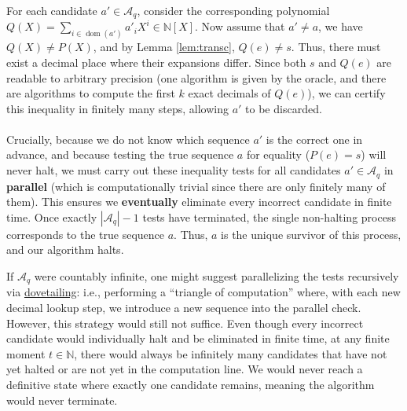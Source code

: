\begin{solution}
    For each candidate \( a'\in \mathcal{A}_{q} \), consider the corresponding polynomial \( Q\left(X\right) = \sum_{i\in \operatorname{dom}\left(a'\right)} a'_i X^i\in\mathbb{N}\left[X\right] \). Now assume that \( a'\neq a \), we have \( Q\left(X\right)\neq P\left(X\right) \), and by Lemma \ref{lem:transc}, \( Q\left(e\right)\neq s \). Thus, there must exist a decimal place where their expansions differ. Since both \( s \) and \( Q\left(e\right) \) are readable to arbitrary precision (one algorithm is given by the oracle, and there are algorithms to compute the first \( k \) exact decimals of \( Q\left(e\right) \)), we can certify this inequality in finitely many steps, allowing \( a' \) to be discarded.
    \\\\
    Crucially, because we do not know which sequence \( a' \) is the correct one in advance, and because testing the true sequence \( a \) for equality (\( P\left(e\right) = s \)) will never halt, we must carry out these inequality tests for all candidates \( a'\in\mathcal{A}_q \) in \textbf{parallel} (which is computationally trivial since there are only finitely many of them). This ensures we \textbf{eventually} eliminate every incorrect candidate in finite time. Once exactly \( |\mathcal{A}_q| - 1 \) tests have terminated, the single non-halting process corresponds to the true sequence \( a \). Thus, \( a \) is the unique survivor of this process, and our algorithm halts.

    \begin{remark}
        If \( \mathcal{A}_q \) were countably infinite, one might suggest parallelizing the tests recursively via \href{https://en.wikipedia.org/wiki/Dovetailing_(computer_science)}{dovetailing}: i.e., performing a ``triangle of computation'' where, with each new decimal lookup step, we introduce a new sequence into the parallel check. However, this strategy would still not suffice. Even though every incorrect candidate would individually halt and be eliminated in finite time, at any finite moment \( t\in\mathbb{N} \), there would always be infinitely many candidates that have not yet halted or are not yet in the computation line. We would never reach a definitive state where exactly one candidate remains, meaning the algorithm would never terminate.
    \end{remark}
\end{solution}
